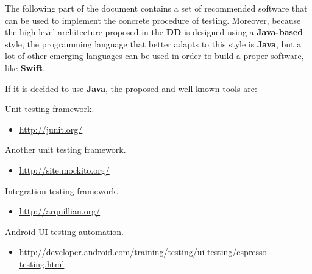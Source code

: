 The following part of the document contains a set of recommended software that can be used to implement the concrete procedure of testing.
Moreover, because the high-level architecture proposed in the \textbf{DD} is designed using a \textbf{Java-based} style, the programming language that better adapts to this style is \textbf{Java}, but a lot of other emerging languages can be used in order to build a proper software, like \textbf{Swift}.\par
If it is decided to use \textbf{Java}, the proposed and well-known tools are:
\begin{itemize}	
	 Unit testing framework.
	\begin{itemize}
		\item 
		\href{http://junit.org/}{http://junit.org/}
	\end{itemize}	
	 Another unit testing framework.
	\begin{itemize}
		\item 
		\href{http://site.mockito.org/}{http://site.mockito.org/}
	\end{itemize}	
	 Integration testing framework.
	\begin{itemize}
		\item \href{http://arquillian.org/}{http://arquillian.org/}
	\end{itemize}
	 Android UI testing automation.
	\begin{itemize}
		\item \href{http://developer.android.com/training/testing/ui-testing/espresso-testing.html}{http://developer.android.com/training/testing/ui-testing/espresso-testing.html}
	\end{itemize}
\end{itemize}
